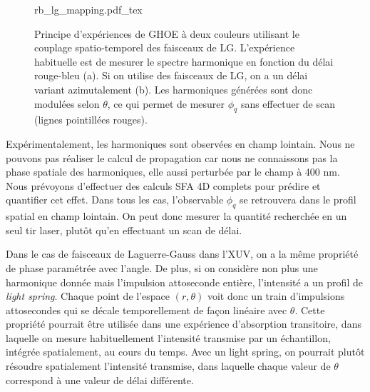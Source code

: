 \begin{figure}[!ht]
\centering
\def\svgwidth{\columnwidth}
{rb_lg_mapping.pdf_tex}
\caption{Principe d'expériences de GHOE à deux couleurs utilisant le couplage spatio-temporel des faisceaux de LG. L'expérience habituelle est de mesurer le spectre harmonique en fonction du délai rouge-bleu (a). Si on utilise des faisceaux de LG, on a un délai variant azimutalement (b). Les harmoniques générées sont donc modulées selon $\theta$, ce qui permet de mesurer $\phi_q$ sans effectuer de scan (lignes pointillées rouges).}
\label{fig:rb_mapping}
\end{figure}
Expérimentalement, les harmoniques sont observées en champ lointain. Nous ne pouvons pas réaliser le calcul de propagation car nous ne connaissons pas la phase spatiale des harmoniques, elle aussi perturbée par le champ à 400 nm. Nous prévoyons d'effectuer des calculs SFA 4D complets pour prédire et quantifier cet effet. Dans tous les cas, l'observable $\phi_q$ se retrouvera dans le profil spatial en champ lointain. On peut donc mesurer la quantité recherchée en un seul tir laser, plutôt qu'en effectuant un scan de délai.

Dans le cas de faisceaux de Laguerre-Gauss dans l'XUV, on a la même propriété de phase paramétrée avec l'angle. De plus, si on considère non plus une harmonique donnée mais l'impulsion attoseconde entière, l'intensité a un profil de \textit{light spring}. Chaque point de l'espace $(r,\theta)$ voit donc un train d'impulsions attosecondes qui se décale temporellement de façon linéaire avec $\theta$. Cette propriété pourrait être utilisée dans une expérience d'absorption transitoire, dans laquelle on mesure habituellement l'intensité transmise par un échantillon, intégrée spatialement, au cours du temps. Avec un light spring, on pourrait plutôt résoudre spatialement l'intensité transmise, dans laquelle chaque valeur de $\theta$ correspond à une valeur de délai différente.

